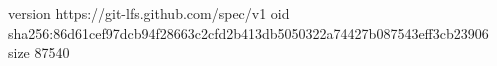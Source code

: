 version https://git-lfs.github.com/spec/v1
oid sha256:86d61cef97dcb94f28663c2cfd2b413db5050322a74427b087543eff3cb23906
size 87540
